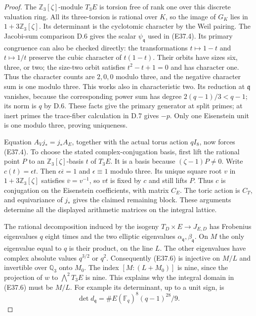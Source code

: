 \begin{proof}
The $\mathbb Z_3[\zeta]$-module $T_3E$ is torsion free
of rank one over this discrete valuation ring.
All its three-torsion is rational over $K$, so the
image of $G_K$ lies in $1+3\mathbb Z_3[\zeta]$.
Its determinant is the cyclotomic character by the
Weil pairing. The Jacobi-sum comparison D.6 gives the
scalar $\psi_{\mathfrak q}$ used in (E37.4).
Its primary congruence can also be checked directly:
the transformations $t\mapsto1-t$ and $t\mapsto1/t$
preserve the cubic character of $t(1-t)$.
Their orbits have sizes six, three, or two; the
size-two orbit satisfies $t^2-t+1=0$ and has character
one. Thus the character counts are $2,0,0$ modulo
three, and the negative character sum is one modulo
three. This works also in characteristic two.
Its reduction at $\mathfrak q$ vanishes, because the
corresponding power sum has degree
$2(q-1)/3<q-1$; its norm is $q$ by D.6.
These facts give the primary generator at split primes;
at inert primes the trace-fiber calculation in D.7
gives $-p$. Only one Eisenstein unit is one modulo
three, proving uniqueness.

Equation $A_Vj_*=j_*A_E$, together with the actual
torus action $qI_8$, now forces (E37.4).
To choose the stated complex-conjugation basis, first
lift the rational point $P$ to an
$\mathbb Z_3[\zeta]$-basis $t$ of $T_3E$.
It is a basis because $(\zeta-1)P\ne0$.
Write $c(t)=\epsilon t$. Then
$\epsilon\overline\epsilon=1$ and $\epsilon\equiv1$
modulo three. Its unique square root $v$ in
$1+3\mathbb Z_3[\zeta]$ satisfies $\overline v=v^{-1}$,
so $vt$ is fixed by $c$ and still lifts $P$.
Thus $c$ is conjugation on the Eisenstein coefficients,
with matrix $C_E$. The toric action is $C_T$, and
equivariance of $j_*$ gives the claimed remaining block.
These arguments determine all the displayed arithmetic
matrices on the integral lattice.

The rational decomposition induced by the isogeny
$T_D\times E\to J_{E,D}$ has Frobenius eigenvalues
$q$ eight times and the two elliptic eigenvalues
$\alpha_{\mathfrak q},\beta_{\mathfrak q}$.
On $M$ the only eigenvalue equal to $q$ is their
product, on the line $L$. The other eigenvalues have
complex absolute values $q^{3/2}$ or $q^2$.
Consequently (E37.6) is injective on $M/L$ and
invertible over $\mathbb Q_3$ onto $M_0$.
The index $[M:(L+M_0)]$ is nine, since the projection
of $w$ to $\bigwedge^2T_3E$ is nine. This explains why
the integral domain in (E37.6) must be $M/L$.
For example its determinant, up to a unit sign, is
\[
 \det d_{\mathfrak q}
    =\#E(\mathbb F_q)^8(q-1)^{28}/9.
 \tag{E37.15}
\]


\end{proof}
